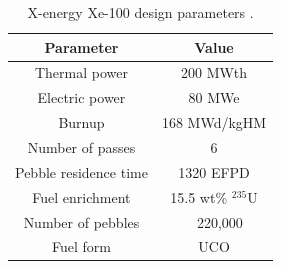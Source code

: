 \begin{table}
    \centering
    \caption{X-energy Xe-100 design parameters \cite{mulder_neutronics_2020}.}
    \label{tab:xe-100}
    \begin{tabular}{c c}
        \hline
        Parameter & Value \\
        \hline 
        Thermal power & 200 MWth\\
        Electric power & 80 MWe\\
        Burnup & 168 MWd/kgHM \\
        Number of passes & 6 \\
        Pebble residence time & 1320 EFPD\\
        Fuel enrichment & 15.5 wt\% $^{235}$U\\
        Number of pebbles & ~ 220,000\\
        Fuel form & UCO\\
        \hline
        
    \end{tabular}
\end{table}

